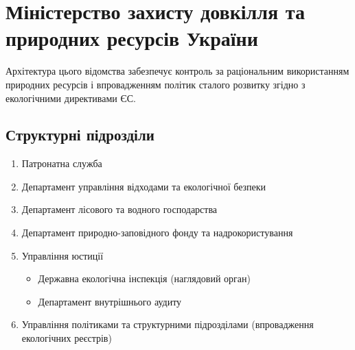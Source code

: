 \newpage
\section{Міністерство захисту довкілля та природних ресурсів України}

Архітектура цього відомства забезпечує контроль за раціональним використанням природних ресурсів і впровадженням політик сталого розвитку згідно з екологічними директивами ЄС.

\subsection*{Структурні підрозділи}

\begin{enumerate}
    \item Патронатна служба
    \item Департамент управління відходами та екологічної безпеки
    \item Департамент лісового та водного господарства
    \item Департамент природно-заповідного фонду та надрокористування
    \item Управління юстиції
    \begin{itemize}
        \item Державна екологічна інспекція (наглядовий орган)
        \item Департамент внутрішнього аудиту
    \end{itemize}
    \item Управління політиками та структурними підрозділами (впровадження екологічних реєстрів)
\end{enumerate}
